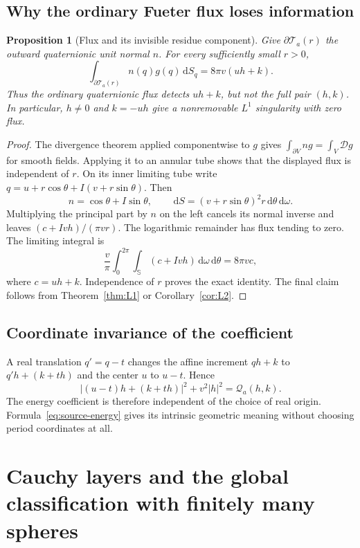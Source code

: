 \documentclass[11pt,a4paper]{article}
\numberwithin{equation}{section}
\newtheorem{proposition}[theorem]{Proposition}
\theoremstyle{definition}
\theoremstyle{remark}
\newcommand{\SSS}{\mathbb S}
\newcommand{\D}{\mathcal D}
\newcommand{\dd}{\,\mathrm d}
\begin{document}
\subsection{Why the ordinary Fueter flux loses information}
\begin{proposition}[Flux and its invisible residue component]
\label{prop:flux}
Give $\partial\mathcal T_a(r)$ the outward quaternionic unit normal $n$.
For every sufficiently small $r>0$,
\begin{equation}\label{eq:flux}
 \int_{\partial\mathcal T_a(r)}n(q)g(q)\dd S_q
       =8\pi v(uh+k).
\end{equation}
Thus the ordinary quaternionic flux detects $uh+k$, but not the full
pair $(h,k)$. In particular, $h\ne0$ and $k=-uh$ give a nonremovable
$L^1$ singularity with zero flux.
\end{proposition}
\begin{proof}
The divergence theorem applied componentwise to $g$ gives
$\int_{\partial V}ng=\int_V\D g$ for smooth fields. Applying it to
an annular tube shows that the displayed flux is independent of $r$.
On its inner limiting tube write
$q=u+r\cos\theta+I(v+r\sin\theta)$. Then
\[
 n=\cos\theta+I\sin\theta,\qquad
 \dd S=(v+r\sin\theta)^2r\dd\theta\dd\omega.
\]
Multiplying the principal part by $n$ on the left cancels its normal
inverse and leaves $(c+Ivh)/(\pi vr)$. The logarithmic remainder has
flux tending to zero. The limiting integral is
\[
 \frac v\pi\int_0^{2\pi}\int_{\SSS}(c+Ivh)
                    \dd\omega\dd\theta=8\pi vc,
\]
where $c=uh+k$. Independence of $r$ proves the exact identity.
The final claim follows from Theorem~\ref{thm:L1} or
Corollary~\ref{cor:L2}.
\end{proof}

\subsection{Coordinate invariance of the coefficient}
A real translation $q'=q-t$ changes the affine increment
$qh+k$ to $q'h+(k+th)$ and the center $u$ to $u-t$.
Hence
\[
 |(u-t)h+(k+th)|^2+v^2|h|^2=\mathcal Q_a(h,k).
\]
The energy coefficient is therefore independent of the choice of real
origin. Formula~\eqref{eq:source-energy} gives its intrinsic geometric
meaning without choosing period coordinates at all.

\section{Cauchy layers and the global classification with finitely many spheres}
\label{sec:layers}
\end{document}
